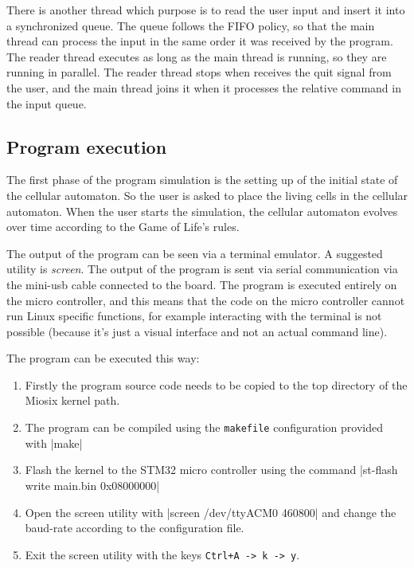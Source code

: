\documentclass[10pt]{article}
\begin{document}
There is another thread which purpose is to read the user input and insert it into a synchronized queue. The queue follows the FIFO policy, so that the main
thread can process the input in the same order it was received by the program. The reader thread executes as long as the main thread is running, 
so they are running in parallel. The reader thread stops when receives the quit signal from the user, and the main thread joins it when it processes the relative
command in the input queue. 

\subsection{Program execution}

The first phase of the program simulation is the setting up of the initial state of the cellular automaton. So the user is asked to place the living cells in the
cellular automaton. When the user starts the simulation, the cellular automaton evolves over time according to the Game of Life's rules.

The output of the program can be seen via a terminal emulator. A suggested utility is \textit{screen}. The output of the program is sent via serial communication
via the mini-usb cable connected to the board. The program is executed entirely on the micro controller, and this means that the code on the micro controller
cannot run Linux specific functions, for example interacting with the terminal is not possible (because it's just a visual interface and not an actual command line).

The program can be executed this way:
\begin{enumerate}
    \item Firstly the program source code needs to be copied to the top directory of the Miosix kernel path.
    \item The program can be compiled using the \verb|makefile| configuration provided with |make|
    \item Flash the kernel to the STM32 micro controller using the command |st-flash write main.bin 0x08000000|
    \item Open the screen utility with
    |screen /dev/ttyACM0 460800|
    \noindent and change the baud-rate according to the configuration file.
    \item Exit the screen utility with the keys \verb|Ctrl+A -> k -> y|.
\end{enumerate}
\end{document}
